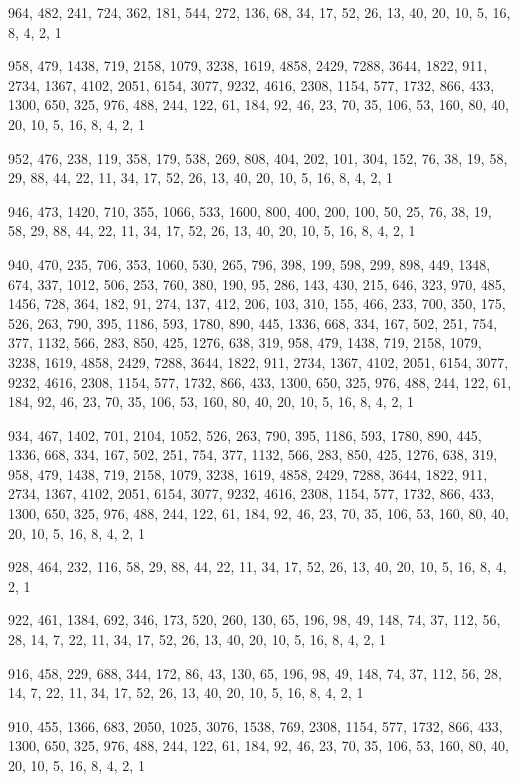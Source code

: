 \documentclass[12pt]{article}
\begin{document}
964, 482, 241, 724, 362, 181, 544, 272, 136, 68, 34, 17, 52, 26, 13, 40, 20, 10, 5, 16, 8, 4, 2, 1

958, 479, 1438, 719, 2158, 1079, 3238, 1619, 4858, 2429, 7288, 3644, 1822, 911, 2734, 1367, 4102, 2051, 6154, 3077, 9232, 4616, 2308, 1154, 577, 1732, 866, 433, 1300, 650, 325, 976, 488, 244, 122, 61, 184, 92, 46, 23, 70, 35, 106, 53, 160, 80, 40, 20, 10, 5, 16, 8, 4, 2, 1

952, 476, 238, 119, 358, 179, 538, 269, 808, 404, 202, 101, 304, 152, 76, 38, 19, 58, 29, 88, 44, 22, 11, 34, 17, 52, 26, 13, 40, 20, 10, 5, 16, 8, 4, 2, 1

946, 473, 1420, 710, 355, 1066, 533, 1600, 800, 400, 200, 100, 50, 25, 76, 38, 19, 58, 29, 88, 44, 22, 11, 34, 17, 52, 26, 13, 40, 20, 10, 5, 16, 8, 4, 2, 1

940, 470, 235, 706, 353, 1060, 530, 265, 796, 398, 199, 598, 299, 898, 449, 1348, 674, 337, 1012, 506, 253, 760, 380, 190, 95, 286, 143, 430, 215, 646, 323, 970, 485, 1456, 728, 364, 182, 91, 274, 137, 412, 206, 103, 310, 155, 466, 233, 700, 350, 175, 526, 263, 790, 395, 1186, 593, 1780, 890, 445, 1336, 668, 334, 167, 502, 251, 754, 377, 1132, 566, 283, 850, 425, 1276, 638, 319, 958, 479, 1438, 719, 2158, 1079, 3238, 1619, 4858, 2429, 7288, 3644, 1822, 911, 2734, 1367, 4102, 2051, 6154, 3077, 9232, 4616, 2308, 1154, 577, 1732, 866, 433, 1300, 650, 325, 976, 488, 244, 122, 61, 184, 92, 46, 23, 70, 35, 106, 53, 160, 80, 40, 20, 10, 5, 16, 8, 4, 2, 1

934, 467, 1402, 701, 2104, 1052, 526, 263, 790, 395, 1186, 593, 1780, 890, 445, 1336, 668, 334, 167, 502, 251, 754, 377, 1132, 566, 283, 850, 425, 1276, 638, 319, 958, 479, 1438, 719, 2158, 1079, 3238, 1619, 4858, 2429, 7288, 3644, 1822, 911, 2734, 1367, 4102, 2051, 6154, 3077, 9232, 4616, 2308, 1154, 577, 1732, 866, 433, 1300, 650, 325, 976, 488, 244, 122, 61, 184, 92, 46, 23, 70, 35, 106, 53, 160, 80, 40, 20, 10, 5, 16, 8, 4, 2, 1

928, 464, 232, 116, 58, 29, 88, 44, 22, 11, 34, 17, 52, 26, 13, 40, 20, 10, 5, 16, 8, 4, 2, 1

922, 461, 1384, 692, 346, 173, 520, 260, 130, 65, 196, 98, 49, 148, 74, 37, 112, 56, 28, 14, 7, 22, 11, 34, 17, 52, 26, 13, 40, 20, 10, 5, 16, 8, 4, 2, 1

916, 458, 229, 688, 344, 172, 86, 43, 130, 65, 196, 98, 49, 148, 74, 37, 112, 56, 28, 14, 7, 22, 11, 34, 17, 52, 26, 13, 40, 20, 10, 5, 16, 8, 4, 2, 1

910, 455, 1366, 683, 2050, 1025, 3076, 1538, 769, 2308, 1154, 577, 1732, 866, 433, 1300, 650, 325, 976, 488, 244, 122, 61, 184, 92, 46, 23, 70, 35, 106, 53, 160, 80, 40, 20, 10, 5, 16, 8, 4, 2, 1
\end{document}
